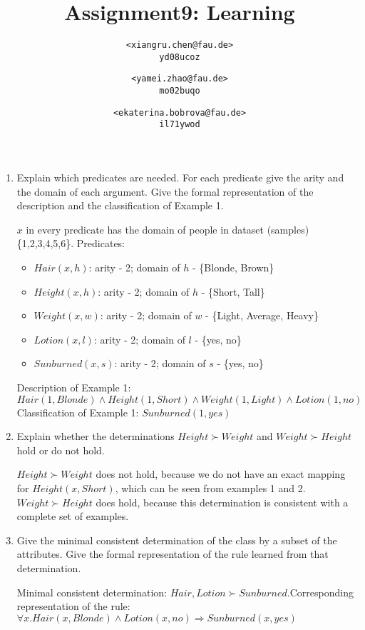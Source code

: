\documentclass{homework}
\title{Assignment9: Learning}
\author{
  \texttt{<xiangru.chen@fau.de>} \\
  \texttt{yd08ucoz}
  \and
  \texttt{<yamei.zhao@fau.de>}\\
  \texttt{mo02buqo}
  \and
  \texttt{<ekaterina.bobrova@fau.de>}\\
  \texttt{il71ywod}
}
\begin{document}
\maketitle

\begin{enumerate}
	\item Explain which predicates are needed. For each predicate give the arity and the domain of each argument. Give the formal representation of the description and the classification of Example 1.

$x$ in every predicate has the domain of people in dataset (samples) \{1,2,3,4,5,6\}.
Predicates:
\begin{itemize}
	\item $Hair(x, h)$: arity - 2; domain of $h$ - \{Blonde, Brown\}
	\item $Height(x, h)$: arity - 2; domain of $h$ - \{Short, Tall\}
	\item $Weight(x, w)$: arity - 2; domain of $w$ - \{Light, Average, Heavy\}
	\item $Lotion(x, l)$: arity - 2; domain of $l$ - \{yes, no\}
	\item $Sunburned(x, s)$: arity - 2; domain of $s$ - \{yes, no\}
\end{itemize}
Description of Example 1: $Hair(1, Blonde)\land Height(1, Short)\land Weight(1, Light)\land  Lotion(1, no)$
Classification of Example 1: $Sunburned(1, yes)$

	\item Explain whether the determinations $Height\succ Weight$ and $Weight\succ Height$ hold or do not hold.

$Height\succ Weight$ does not hold, because we do not have an exact mapping for $Height(x, Short)$, which can be seen from examples 1 and 2. \newline $Weight\succ Height$ does hold, because this determination is consistent with a complete set of examples.
	\item Give the minimal consistent determination of the class by a subset of the attributes. Give the formal representation of the rule learned from that determination.

Minimal consistent determination: $Hair, Lotion\succ Sunburned$.\newline Corresponding representation of the rule: $\forall x.Hair(x,Blonde)\land  Lotion(x, no)\Rightarrow Sunburned(x, yes)$
\end{enumerate}
\end{document}
